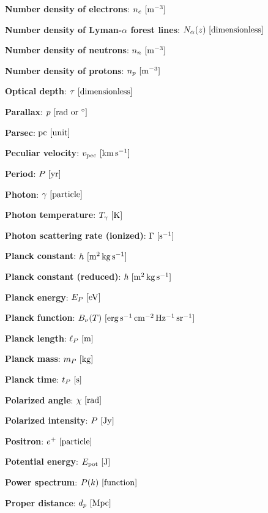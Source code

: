 \documentclass[a4paper,11pt]{article}
\begin{document}
{\noindent}\textbf{Number density of electrons}: $n_e ~ [{\rm m^{-3}}]$

{\noindent}\textbf{Number density of Lyman-$\alpha$ forest lines}: $N_\alpha(z) ~ [{\rm dimensionless}]$

{\noindent}\textbf{Number density of neutrons}: $n_n ~ [{\rm m^{-3}}]$

{\noindent}\textbf{Number density of protons}: $n_p ~ [{\rm m^{-3}}]$

{\noindent}\textbf{Optical depth}: $\tau ~ [{\rm dimensionless}]$

{\noindent}\textbf{Parallax}: $p ~ [{\rm rad~or~^\circ}]$

{\noindent}\textbf{Parsec}: ${\rm pc} ~ [{\rm unit}]$

{\noindent}\textbf{Peculiar velocity}: $v_{\rm pec} ~ [{\rm km\,s^{-1}}]$

{\noindent}\textbf{Period}: $P ~ [{\rm yr}]$

{\noindent}\textbf{Photon}: $\gamma ~ [{\rm particle}]$

{\noindent}\textbf{Photon temperature}: $T_\gamma ~ [{\rm K}]$

{\noindent}\textbf{Photon scattering rate (ionized)}: $\Gamma ~ [{\rm s^{-1}}]$

{\noindent}\textbf{Planck constant}: $h ~ [{\rm m^2\,kg\,s^{-1}}]$

{\noindent}\textbf{Planck constant (reduced)}: $\hbar ~ [{\rm m^2\,kg\,s^{-1}}]$

{\noindent}\textbf{Planck energy}: $E_P ~ [{\rm eV}]$

{\noindent}\textbf{Planck function}: $B_\nu(T) ~ [{\rm erg\,s^{-1}\,cm^{-2}\,Hz^{-1}\,sr^{-1}}]$

{\noindent}\textbf{Planck length}: $\ell_P ~ [{\rm m}]$

{\noindent}\textbf{Planck mass}: $m_P ~ [{\rm kg}]$

{\noindent}\textbf{Planck time}: $t_P ~ [{\rm s}]$

{\noindent}\textbf{Polarized angle}: $\chi ~ [{\rm rad}]$

{\noindent}\textbf{Polarized intensity}: $P ~ [{\rm Jy}]$

{\noindent}\textbf{Positron}: $e^+ ~ [{\rm particle}]$

{\noindent}\textbf{Potential energy}: $E_\mathrm{pot} ~ [{\rm J}]$

{\noindent}\textbf{Power spectrum}: $P(k) ~ [{\rm function}]$

{\noindent}\textbf{Proper distance}: $d_p ~ [{\rm Mpc}]$
\end{document}
